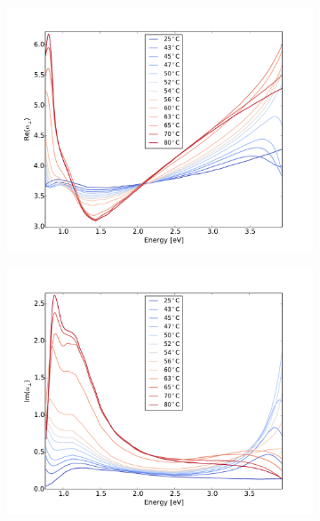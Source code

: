 %
%
\begin{figure}
    \centering
    \begin{subfigure}[b]{0.49\textwidth}
        \centering
        \includegraphics[width=\textwidth]{Results/Sim1/re_alpha_perp.pdf}
        \caption{}
        \label{fig:}
    \end{subfigure}
    \begin{subfigure}[b]{0.49\textwidth}
        \centering
        \includegraphics[width=\textwidth]{Results/Sim1/im_alpha_perp.pdf}
        \caption{}
        \label{fig:}
    \end{subfigure}

\end{figure}
